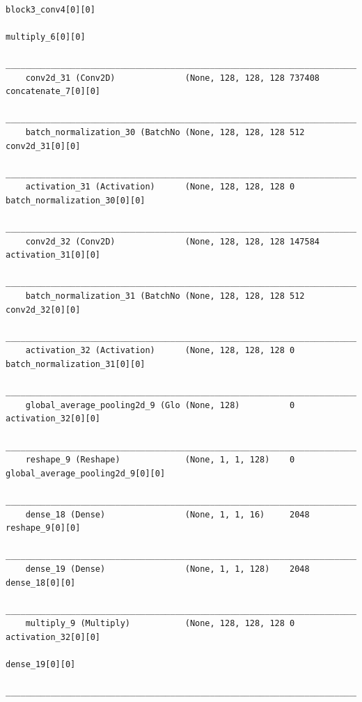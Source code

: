 {\begin{verbatim}
                                                                        block3_conv4[0][0]               
                                                                        multiply_6[0][0]                 
    __________________________________________________________________________________________________
    conv2d_31 (Conv2D)              (None, 128, 128, 128 737408      concatenate_7[0][0]              
    __________________________________________________________________________________________________
    batch_normalization_30 (BatchNo (None, 128, 128, 128 512         conv2d_31[0][0]                  
    __________________________________________________________________________________________________
    activation_31 (Activation)      (None, 128, 128, 128 0           batch_normalization_30[0][0]     
    __________________________________________________________________________________________________
    conv2d_32 (Conv2D)              (None, 128, 128, 128 147584      activation_31[0][0]              
    __________________________________________________________________________________________________
    batch_normalization_31 (BatchNo (None, 128, 128, 128 512         conv2d_32[0][0]                  
    __________________________________________________________________________________________________
    activation_32 (Activation)      (None, 128, 128, 128 0           batch_normalization_31[0][0]     
    __________________________________________________________________________________________________
    global_average_pooling2d_9 (Glo (None, 128)          0           activation_32[0][0]              
    __________________________________________________________________________________________________
    reshape_9 (Reshape)             (None, 1, 1, 128)    0           global_average_pooling2d_9[0][0] 
    __________________________________________________________________________________________________
    dense_18 (Dense)                (None, 1, 1, 16)     2048        reshape_9[0][0]                  
    __________________________________________________________________________________________________
    dense_19 (Dense)                (None, 1, 1, 128)    2048        dense_18[0][0]                   
    __________________________________________________________________________________________________
    multiply_9 (Multiply)           (None, 128, 128, 128 0           activation_32[0][0]              
                                                                        dense_19[0][0]                   
    __________________________________________________________________________________________________

\end{verbatim}}
